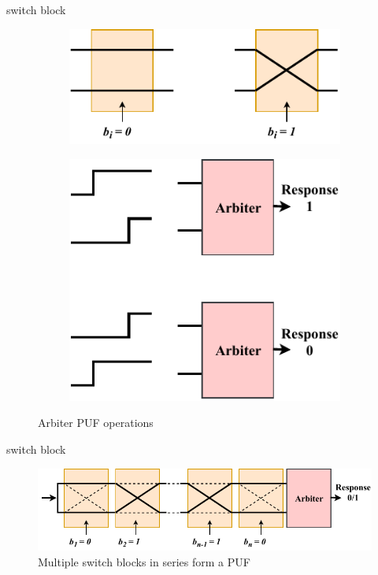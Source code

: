 \documentclass[10pt, compress]{beamer}
\begin{document}
\begin{frame}{switch block}
    \begin{figure}[ht]
        \centering
        \begin{subfigure}[b]{0.58\textwidth}
            \includegraphics[width=\textwidth]{figures/switch_block_operations.pdf}
            \label{fig:switch_block_operations}
        \end{subfigure}
        \begin{subfigure}[b]{0.33\textwidth}
            \includegraphics[width=\textwidth]{figures/arbiter_operation.pdf}
            \label{fig:arbiter_operations}
        \end{subfigure}
        \caption{Arbiter PUF operations}\label{fig:puf_operations}
    \end{figure}
\end{frame}


\begin{frame}{switch block}
    \begin{figure}
        \centering
        \includegraphics[width=\textwidth]{figures/multiple_switch_blocks.pdf}
        \caption{Multiple switch blocks in series form a PUF}
    \end{figure}
\end{frame}
\end{document}
